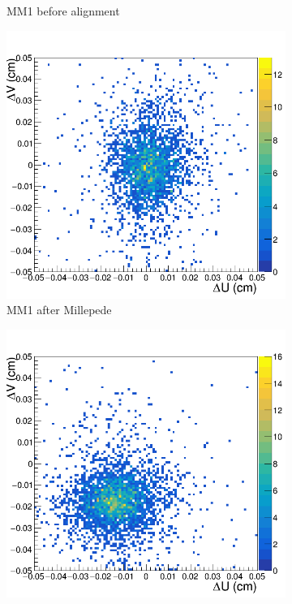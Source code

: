 \begin{figure}[h!]
\begin{subfigure}[l]{.45\textwidth}
   \caption{MM1 before alignment}
   \label{fig:MX1_before}
 \end{subfigure}
 \begin{subfigure}[r]{.45\textwidth}
   \centering
   \includegraphics[width=\linewidth]{thesis_figures/alignment/Run_3211_after_millepede/square/MX1.png}
   \caption{MM1 after Millepede}
   \label{fig:MX1_after}
 \end{subfigure}
 \hfill
 \begin{subfigure}[l]{.45\textwidth}
   \centering
   \includegraphics[width=\linewidth]{thesis_figures/alignment/Run_3211_before/square/MX2.png}

\end{subfigure}
\end{figure}
